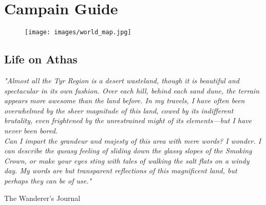 \chapter{Campain Guide}

\begin{figure}[H]
\centering
\texttt{[image: images/world\_map.jpg]}
\end{figure}

\section{Life on Athas}

\epigraph{\textit{
"Almost all the Tyr Region is a desert wasteland, though it is beautiful and
spectacular in its own fashion. Over each hill, behind each sand dune, the
terrain appears more awesome than the land before. In my travels, I have
often been overwhelmed by the sheer magnitude of this land, cowed by its
indifferent brutality, even frightened by the unrestrained
might of its elements—but I have never been bored.\\
Can I impart the grandeur and majesty of this area with mere words? I
wonder. I can describe the queasy feeling of sliding down the glassy
slopes of the Smoking Crown, or make your eyes sting with tales of
walking the salt flats on a windy day. My words are but transparent
reflections of this magnificent land, but perhaps they can be of use." }}
{ The Wanderer’s Journal }


